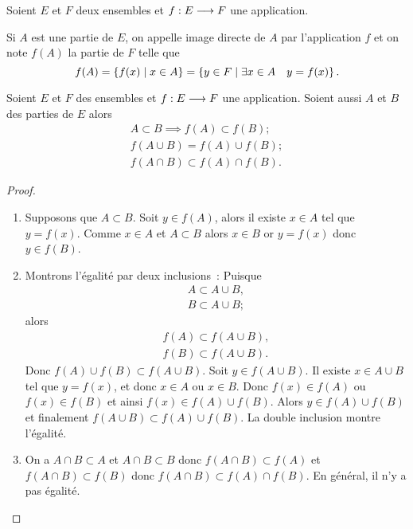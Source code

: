 Soient \(E\) et \(F\) deux ensembles et \(f:E \longrightarrow{} F\) une
application.
\begin{defdef}
  Si \(A\) est une partie de \(E\), on appelle image directe de \(A\) par
  l'application \(f\) et on note \(f(A)\) la partie de \(F\) telle que
  \begin{equation}
    f(A)=\left\{f(x)\mathrel{}\middle|\mathrel{}x\in{}A\right\} = \left\{y\in{}F\mathrel{}\middle|\mathrel{}\exists{}x\in{}A\quad{}y=f(x)\right\}.
  \end{equation}
\end{defdef}

\begin{prop}
  Soient \(E\) et \(F\) des ensembles et \(f:E \longrightarrow{} F\) une
  application. Soient aussi \(A\) et \(B\) des parties de \(E\) alors
  \begin{gather}
    A \subset{}B \implies f(A) \subset{}f(B); \\
    f(A \cup B) = f(A) \cup f(B); \\
    f(A \cap B) \subset{}f(A) \cap f(B).
  \end{gather}
\end{prop}

\begin{proof}
  \begin{enumerate}
    \item Supposons que \(A \subset{}B\). Soit \(y \in{}f(A)\), alors il
      existe \(x \in{}A\) tel que \(y = f(x)\). Comme \(x \in{}A\) et \(A
      \subset{}B\) alors \(x \in{}B\) or \(y = f(x)\) donc \(y \in{}f(B)\).
    \item Montrons l'égalité par deux inclusions~: Puisque
      \begin{gather*}
        A \subset{}A \cup B, \\
        B \subset{}A \cup B;
      \end{gather*}
      alors
      \begin{gather*}
        f(A) \subset{}f(A \cup B), \\
        f(B) \subset{}f(A \cup B).
      \end{gather*}
      Donc \(f(A) \cup f(B) \subset{}f(A \cup B)\).
      Soit \(y \in{}f(A \cup B)\). Il existe \(x \in{}A \cup B\) tel que
      \(y = f(x)\), et donc \(x \in{}A\) ou \(x \in{}B\). Donc \(f(x) \in{}
      f(A)\) ou \(f(x) \in{}f(B)\) et ainsi \(f(x) \in{}f(A) \cup  f(B)\).
      Alors \(y \in{}f(A) \cup f(B)\) et finalement \(f(A \cup B) \subset{}
      f(A) \cup f(B)\). La double inclusion montre l'égalité.
    \item On a \(A \cap B \subset{}A\) et \(A \cap B \subset{}B\) donc \(f(A
      \cap B) \subset{}f(A)\) et \(f(A \cap B) \subset{}f(B)\) donc \(f(A
      \cap B) \subset{}f(A) \cap f(B)\). En général, il n'y a pas égalité.
  \end{enumerate}
\end{proof}


